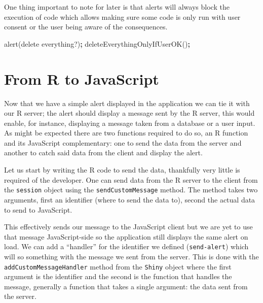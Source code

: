 \documentclass[
]{krantz}
\makeatletter
\newenvironment{Shaded}{\begin{snugshade}}{\end{snugshade}}
\newcommand{\AttributeTok}[1]{\textcolor[rgb]{0.61,0.61,0.61}{#1}}
\newcommand{\CommentTok}[1]{\textcolor[rgb]{0.37,0.37,0.37}{\textit{#1}}}
\newcommand{\ControlFlowTok}[1]{\textcolor[rgb]{0.27,0.27,0.27}{\textbf{#1}}}
\newcommand{\DataTypeTok}[1]{\textcolor[rgb]{0.27,0.27,0.27}{#1}}
\newcommand{\KeywordTok}[1]{\textcolor[rgb]{0.27,0.27,0.27}{\textbf{#1}}}
\newcommand{\NormalTok}[1]{#1}
\newcommand{\OperatorTok}[1]{\textcolor[rgb]{0.43,0.43,0.43}{\textbf{#1}}}
\newcommand{\StringTok}[1]{\textcolor[rgb]{0.5,0.5,0.5}{#1}}
\newenvironment{kframe}{%
\medskip{}
\setlength{\fboxsep}{.8em}
 \def\at@end@of@kframe{}%
 \ifinner\ifhmode%
  \def\at@end@of@kframe{\end{minipage}}%
  \begin{minipage}{\columnwidth}%
 \fi\fi%
 \def\FrameCommand##1{\hskip\@totalleftmargin \hskip-\fboxsep
 \colorbox{shadecolor}{##1}\hskip-\fboxsep
     \hskip-\linewidth \hskip-\@totalleftmargin \hskip\columnwidth}%
 \MakeFramed {\advance\hsize-\width
   \@totalleftmargin\z@ \linewidth\hsize
   \@setminipage}}%
 {\par\unskip\endMakeFramed%
 \at@end@of@kframe}
\renewenvironment{Shaded}{\begin{kframe}}{\end{kframe}}
\makeatother
\begin{document}
One thing important to note for later is that alerts will always block the execution of code which allows making sure some code is only run with user consent or the user being aware of the consequences.

\begin{Shaded}
\begin{Highlighting}[]
\AttributeTok{alert}\NormalTok{(}\StringTok{\textquotesingle{}delete everything?\textquotesingle{}}\NormalTok{)}\OperatorTok{;}
\AttributeTok{deleteEverythingOnlyIfUserOK}\NormalTok{()}\OperatorTok{;}
\end{Highlighting}
\end{Shaded}

\hypertarget{from-r-to-javascript}{%
\section*{From R to JavaScript}\label{from-r-to-javascript}}


Now that we have a simple alert displayed in the application we can tie it with our R server; the alert should display a message sent by the R server, this would enable, for instance, displaying a message taken from a database or a user input. As might be expected there are two functions required to do so, an R function and its JavaScript complementary: one to send the data from the server and another to catch said data from the client and display the alert.

Let us start by writing the R code to send the data, thankfully very little is required of the developer. One can send data from the R server to the client from the \texttt{session} object using the \texttt{sendCustomMessage} method. The method takes two arguments, first an identifier (where to send the data to), second the actual data to send to JavaScript.

\begin{Shaded}
\end{Shaded}

This effectively sends our message to the JavaScript client but we are yet to use that message JavaScript-side so the application still displays the same alert on load. We can add a ``handler'' for the identifier we defined (\texttt{send-alert}) which will so something with the message we sent from the server. This is done with the \texttt{addCustomMessageHandler} method from the \texttt{Shiny} object where the first argument is the identifier and the second is the function that handles the message, generally a function that takes a single argument: the data sent from the server.
\end{document}
